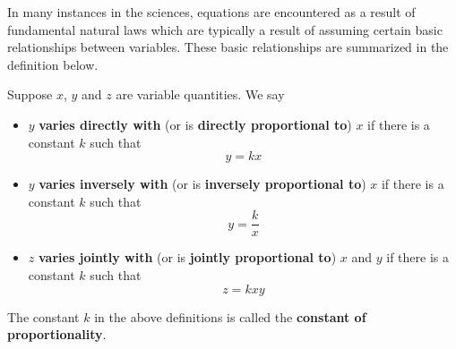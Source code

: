 \documentclass{ximera}
\begin{document}
	\author{Stitz-Zeager}




\setcounter{footnote}{0}

\label{AppVariation}

In many instances in the sciences, equations are encountered as a result of fundamental natural laws which are typically a result of assuming certain basic relationships between variables.  These basic relationships are summarized in the definition below.

\smallskip


\begin{definition} \label{variation}  Suppose $x$, $y$ and $z$ are variable quantities.  We say

\begin{itemize}

\item  $y$ \textbf{varies directly with} (or is \textbf{directly proportional to}) $x$ if there is a constant $k$ such that \[y=kx\]

\item  $y$ \textbf{varies inversely with} (or is \textbf{inversely proportional to}) $x$ if there is a constant $k$ such that \[y=\frac{k}{x}\]

\item  $z$ \textbf{varies jointly with} (or is \textbf{jointly proportional to}) $x$ and $y$ if there is a constant $k$ such that \[z = kxy\]

\end{itemize}

The constant $k$ in the above definitions is called the \textbf{constant of proportionality}.

\end{definition}


\smallskip
\end{document}

